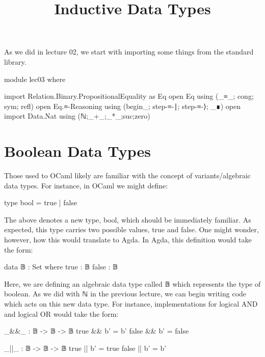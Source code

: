 \documentclass{lecturenotes}
\title{Inductive Data Types}
\newcommand{\agdanats}{\textsf{ℕ}\xspace}
\newcommand{\agdabool}{\textsf{𝔹}\xspace}
\begin{document}
\maketitle

As we did in lecture 02, we start with importing some things from the standard library. 

\begin{center}
    \begin{code}
        module lec03 where
        
        import Relation.Binary.PropositionalEquality as Eq
        open Eq using (_≡_; cong; sym; refl)
        open Eq.≡-Reasoning using (begin_; step-≡-∣; step-≡-⟩; _∎)
        open import Data.Nat using (ℕ;_+_;_*_;suc;zero)
    \end{code}
\end{center}


\section{Boolean Data Types}
\label{sec:boolean-data-types}

Those used to OCaml likely are familiar with the concept of variants/algebraic data types.
For instance, in OCaml we might define:

\begin{center}
    \textsf{type bool = true | false}
\end{center}

The above denotes a new type, bool, which should be immediately familiar.
As expected, this type carries two possible values, true and false.
One might wonder, however, how this would translate to Agda.
In Agda, this definition would take the form:

\begin{center}
    \begin{code}
        data 𝔹 : Set where
            true : 𝔹
            false : 𝔹
    \end{code}
\end{center}

Here, we are defining an algebraic data type called \agdabool which represents the type of boolean.
As we did with \agdanats in the previous lecture, we can begin writing code which acts on this new data type.
For instance, implementations for logical AND and logical OR would take the form:

\begin{center}
    \begin{code}
        _&&_ : 𝔹 -> 𝔹 -> 𝔹
        true && b' = b'
        false && b' = false 

        _||_ : 𝔹 -> 𝔹 -> 𝔹 
        true || b' = true 
        false || b' = b' 
    \end{code}
\end{center}
\end{document}
